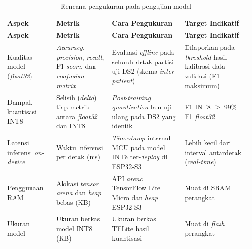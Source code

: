 \begin{center}
  \setlength{\tabcolsep}{4pt}
  \renewcommand{\arraystretch}{1.15}
  \small
  \begin{longtable}{>{\RaggedRight\arraybackslash}p{2.5cm}>{\RaggedRight\arraybackslash}p{3.2cm}>{\RaggedRight\arraybackslash}p{4.6cm}>{\RaggedRight\arraybackslash}p{2.5cm}}
    \caption{Rencana pengukuran pada pengujian model}
    \label{tab:pengujian-model} \\
    \toprule
    \textbf{Aspek} & \textbf{Metrik} & \textbf{Cara Pengukuran} & \textbf{Target Indikatif} \\
    \midrule
    \endfirsthead
    \toprule
    \textbf{Aspek} & \textbf{Metrik} & \textbf{Cara Pengukuran} & \textbf{Target Indikatif} \\
    \midrule
    \endhead
    \bottomrule
    \endfoot
    Kualitas model (\textit{float32}) &
    \textit{Accuracy}, \textit{precision}, \textit{recall}, F1-\textit{score}, dan \textit{confusion matrix} &
    Evaluasi \textit{offline} pada seluruh detak partisi uji DS2 (skema \textit{inter-patient}) &
    Dilaporkan pada \textit{threshold} hasil kalibrasi data validasi (F1 maksimum) \\
    Dampak kuantisasi INT8 &
    Selisih (\textit{delta}) tiap metrik antara \textit{float32} dan INT8 &
    \textit{Post-training quantization} lalu uji ulang pada DS2 yang identik &
    F1 INT8 $\geq$ 99\% F1 \textit{float32} \\
    Latensi inferensi \textit{on-device} &
    Waktu inferensi per detak (ms) &
    \textit{Timestamp} internal MCU pada model INT8 ter-\textit{deploy} di ESP32-S3 &
    Lebih kecil dari interval antardetak (\textit{real-time}) \\
    Penggunaan RAM &
    Alokasi \textit{tensor arena} dan \textit{heap} bebas (KB) &
    API \textit{arena} TensorFlow Lite Micro dan \textit{heap} ESP32-S3 &
    Muat di SRAM perangkat \\
    Ukuran model &
    Ukuran berkas model INT8 (KB) &
    Ukuran berkas TFLite hasil kuantisasi &
    Muat di \textit{flash} perangkat \\
  \end{longtable}
  \par{}
\end{center}

